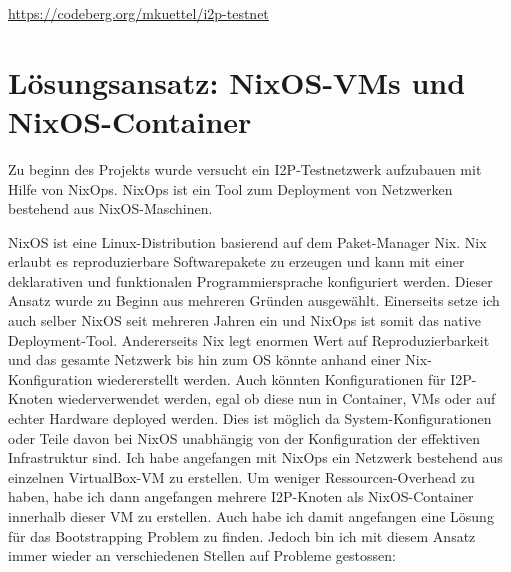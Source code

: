 \url{https://codeberg.org/mkuettel/i2p-testnet}


\section{Lösungsansatz: NixOS-VMs und NixOS-Container}\label{sec:la1_nixos}

Zu beginn des Projekts wurde versucht ein I2P-Testnetzwerk aufzubauen mit Hilfe von NixOps.
NixOps ist ein Tool zum Deployment von Netzwerken bestehend aus NixOS-Maschinen.
\cite{noauthor_nixops_nodate-5}

NixOS ist eine Linux-Distribution basierend auf dem Paket-Manager Nix.
Nix erlaubt es reproduzierbare Softwarepakete zu erzeugen und kann mit einer deklarativen und funktionalen Programmiersprache konfiguriert werden.
Dieser Ansatz wurde zu Beginn aus mehreren Gründen ausgewählt.
Einerseits setze ich auch selber NixOS seit mehreren Jahren ein und NixOps ist somit das native Deployment-Tool.
Andererseits Nix legt enormen Wert auf Reproduzierbarkeit und das gesamte Netzwerk bis hin zum OS könnte anhand einer Nix-Konfiguration wiedererstellt werden.
Auch könnten Konfigurationen für I2P-Knoten wiederverwendet werden, egal ob diese nun in Container,
VMs oder auf echter Hardware deployed werden.
Dies ist möglich da System-Konfigurationen oder Teile davon bei NixOS unabhängig von der Konfiguration der effektiven Infrastruktur sind.
Ich habe angefangen mit NixOps ein Netzwerk bestehend aus einzelnen VirtualBox-VM zu erstellen.
Um weniger Ressourcen-Overhead zu haben, habe ich dann angefangen mehrere I2P-Knoten als NixOS-Container innerhalb dieser VM zu erstellen.
Auch habe ich damit angefangen eine Lösung für das Bootstrapping Problem zu finden.
Jedoch bin ich mit diesem Ansatz immer wieder an verschiedenen Stellen auf Probleme gestossen:

